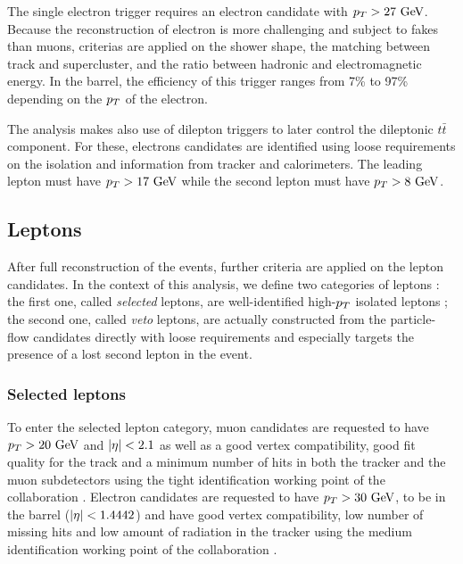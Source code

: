     The single electron trigger requires an electron candidate with $p_T > 27~\text{GeV}$. Because
    the reconstruction of electron is more challenging and subject to fakes than muons,
    criterias are applied on the shower shape, the matching between track and supercluster,
    and the ratio between hadronic and electromagnetic energy. In the barrel, the efficiency
    of this trigger ranges from 7\% to 97\% depending on the $p_T$ of the electron.

    The analysis makes also use of dilepton triggers to later control the dileptonic
    $t\bar{t}$ component. For these, electrons candidates are identified using loose
    requirements on the isolation and information from tracker and calorimeters. The
    leading lepton must have $p_T > 17~\text{GeV}$ while the second lepton must have $p_T > 8~\text{GeV}$.

        \subsection{Leptons}

    After full reconstruction of the events, further criteria are applied on the lepton
    candidates. In the context of this analysis, we define two categories of leptons :
    the first one, called \emph{selected} leptons, are well-identified high-$p_T$
    isolated leptons ; the second one, called \emph{veto} leptons, are actually
    constructed from the particle-flow candidates directly with loose requirements and
    especially targets the presence of a lost second lepton in the event.

            \subsubsection{Selected leptons}

        To enter the selected lepton category, muon candidates are requested to have
    $p_T > 20~\text{GeV}$ and $\left| \eta \right| < 2.1$ as well as a good vertex compatibility, good fit
    quality for the track and a minimum number of hits in both the tracker and the muon
    subdetectors using the tight identification working point of the collaboration
    .
        Electron candidates are requested to have $p_T > 30~\text{GeV}$, to be in the barrel
    ($\left| \eta \right| < 1.4442$) and have good vertex compatibility, low number of missing hits
    and low amount of radiation in the tracker using the medium identification working
    point of the collaboration
    .

